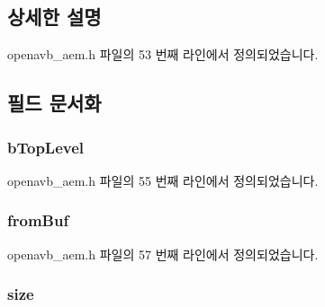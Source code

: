 \subsection{상세한 설명}


openavb\+\_\+aem.\+h 파일의 53 번째 라인에서 정의되었습니다.



\subsection{필드 문서화}
\subsubsection[{\texorpdfstring{b\+Top\+Level}{bTopLevel}}]{ b\+Top\+Level}\hypertarget{structopenavb__descriptor__pvt_ad805028b95b0f83445d688c1fe4f6d05}{}\label{structopenavb__descriptor__pvt_ad805028b95b0f83445d688c1fe4f6d05}


openavb\+\_\+aem.\+h 파일의 55 번째 라인에서 정의되었습니다.

\subsubsection[{\texorpdfstring{from\+Buf}{fromBuf}}]{ from\+Buf}\hypertarget{structopenavb__descriptor__pvt_a878fe548a92bbc11fe864b6852d029ef}{}\label{structopenavb__descriptor__pvt_a878fe548a92bbc11fe864b6852d029ef}


openavb\+\_\+aem.\+h 파일의 57 번째 라인에서 정의되었습니다.

\subsubsection[{\texorpdfstring{size}{size}}]{ size}\hypertarget{structopenavb__descriptor__pvt_a48d1688d27e52f04e303777351a4779a}{}\label{structopenavb__descriptor__pvt_a48d1688d27e52f04e303777351a4779a}



